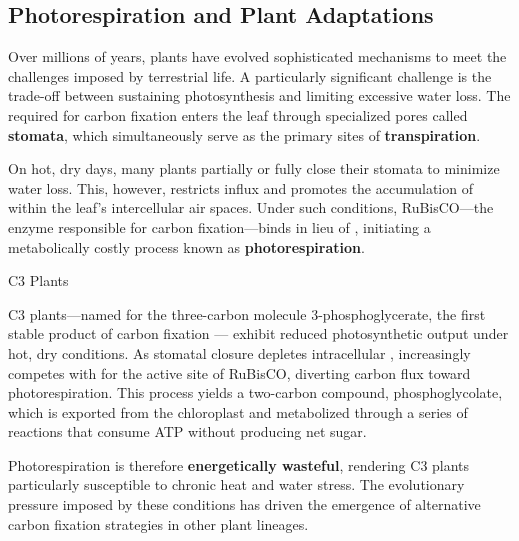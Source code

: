 \documentclass[10pt]{article}
\begin{document}
  \subsection{Photorespiration and Plant Adaptations}
    
    Over millions of years, plants have evolved sophisticated mechanisms to meet the challenges imposed by terrestrial life. A particularly significant challenge is the trade-off between sustaining photosynthesis and limiting excessive water loss. The  required for carbon fixation enters the leaf through specialized pores called \textbf{stomata}, which simultaneously serve as the primary sites of \textbf{transpiration}.

    On hot, dry days, many plants partially or fully close their stomata to minimize water loss. This, however, restricts  influx and promotes the accumulation of  within the leaf's intercellular air spaces. Under such conditions, RuBisCO---the enzyme responsible for carbon fixation---binds  in lieu of , initiating a metabolically costly process known as \textbf{photorespiration}.

    \begin{core}{C3 Plants}

      C3 plants---named for the three-carbon molecule 3-phosphoglycerate, the first stable product of carbon fixation --- exhibit reduced photosynthetic output under hot, dry conditions. As stomatal closure depletes intracellular ,  increasingly competes with  for the active site of RuBisCO, diverting carbon flux toward photorespiration. This process yields a two-carbon compound, phosphoglycolate, which is exported from the chloroplast and metabolized through a series of reactions that consume ATP without producing net sugar. 

      Photorespiration is therefore \textbf{energetically wasteful}, rendering C3 plants particularly susceptible to chronic heat and water stress. The evolutionary pressure imposed by these conditions has driven the emergence of alternative carbon fixation strategies in other plant lineages.

    \end{core}
\end{document}
